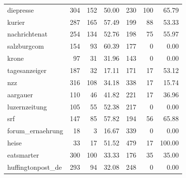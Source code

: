 \begin{table}
\begin{tabular}{lrrrrrr}
		diepresse          &            304 &               152 &            50.00 &                 230 &                100 &                 65.79 \\
		kurier             &            287 &               165 &            57.49 &                 199 &                 88 &                 53.33 \\
		nachrichtenat      &            254 &               134 &            52.76 &                 198 &                 75 &                 55.97 \\
		salzburgcom        &            154 &                93 &            60.39 &                 177 &                  0 &                  0.00 \\
		krone              &             97 &                31 &            31.96 &                 143 &                  0 &                  0.00 \\
		tagesanzeiger      &            187 &                32 &            17.11 &                 171 &                 17 &                 53.12 \\
		nzz                &            316 &               108 &            34.18 &                 338 &                 17 &                 15.74 \\
		aargauer           &            110 &                46 &            41.82 &                 221 &                 17 &                 36.96 \\
		luzernzeitung      &            105 &                55 &            52.38 &                 217 &                  0 &                  0.00 \\
		srf                &            147 &                85 &            57.82 &                 194 &                 56 &                 65.88 \\
		forum\_ernaehrung  &             18 &                 3 &            16.67 &                 339 &                  0 &                  0.00 \\
		heise              &             33 &                17 &            51.52 &                 479 &                 17 &                100.00 \\
		eatsmarter         &            300 &               100 &            33.33 &                 176 &                 35 &                 35.00 \\
		huffingtonpost\_de &            293 &                94 &            32.08 &                 248 &                  0 &                  0.00 \\

\end{tabular}
\end{table}
